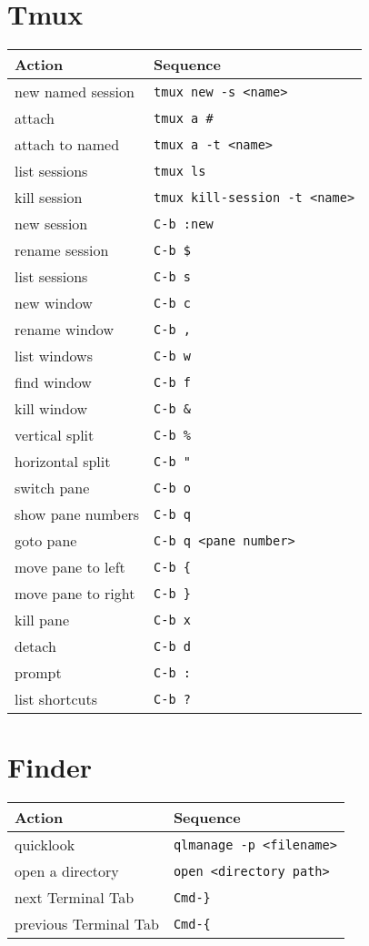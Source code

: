\documentclass[report,twocolumn]{IEEEtran}
\begin{document}
\section{Tmux}
\begin{center}
\begin{tabular}{ l | l }
\hline
Action & Sequence\\
\hline
new named session & \texttt{tmux new -s <name>} \\
attach & \texttt{tmux a \#} \\
attach to named & \texttt{tmux a -t <name>} \\
list sessions & \texttt{tmux ls} \\
kill session & \texttt{tmux kill-session -t <name>} \\
\hline
new session & \texttt{C-b :new} \\
rename session & \texttt{C-b \$} \\
list sessions & \texttt{C-b s} \\
\hline
new window & \texttt{C-b c} \\
rename window & \texttt{C-b ,} \\
list windows & \texttt{C-b w} \\
find window & \texttt{C-b f} \\
kill window & \texttt{C-b \&} \\
\hline
vertical split & \texttt{C-b \%} \\
horizontal split & \texttt{C-b "} \\
switch pane & \texttt{C-b o} \\
show pane numbers & \texttt{C-b q} \\
goto pane & \texttt{C-b q <pane number>} \\
move pane to left & \texttt{C-b \{} \\
move pane to right & \texttt{C-b \}} \\
kill pane & \texttt{C-b x} \\
\hline
detach & \texttt{C-b d} \\
prompt & \texttt{C-b :} \\
list shortcuts & \texttt{C-b ?} \\
\hline
\end{tabular}
\end{center}
\section{Finder}
\begin{center}
\begin{tabular}{ l | l }
\hline
Action & Sequence\\
\hline
quicklook & \texttt{qlmanage -p <filename>} \\
open a directory & \texttt{open <directory path>} \\
next Terminal Tab & \texttt{Cmd-\}} \\
previous  Terminal Tab & \texttt{Cmd-\{} \\
\hline
\end{tabular}
\end{center}
\end{document}
